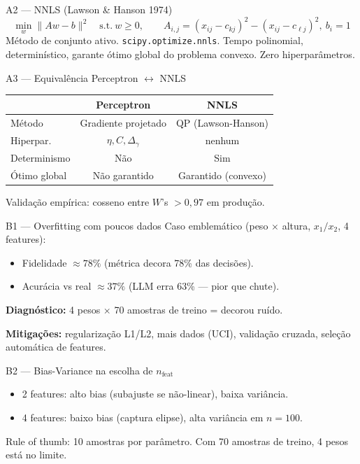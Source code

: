 \documentclass[aspectratio=169,10pt]{beamer}
\begin{document}
\begin{frame}{A2 --- NNLS (Lawson \& Hanson 1974)}
  \scriptsize
  \[ \min_w \|Aw - b\|^2 \quad \text{s.t.}\ w \geq 0, \qquad A_{i,j} = (x_{ij} - c_{kj})^2 - (x_{ij} - c_{\ell j})^2,\ b_i = 1 \]
  M\'etodo de conjunto ativo. \texttt{scipy.optimize.nnls}. Tempo polinomial, determin\'istico, garante \'otimo global do problema convexo. Zero hiperpar\^ametros.
\end{frame}

\begin{frame}{A3 --- Equival\^encia Perceptron $\leftrightarrow$ NNLS}
  \scriptsize
  \begin{center}
  \begin{tabular}{lcc}
    \toprule
    & Perceptron & NNLS \\
    \midrule
    M\'etodo  & Gradiente projetado & QP (Lawson-Hanson) \\
    Hiperpar.\ & $\eta, C, \Delta_\gamma$ & nenhum \\
    Determinismo & N\~ao & Sim \\
    \'Otimo global & N\~ao garantido & Garantido (convexo) \\
    \bottomrule
  \end{tabular}
  \end{center}
  \medskip
  Valida\c{c}\~ao emp\'irica: cosseno entre $W$'s $> 0{,}97$ em produ\c{c}\~ao.
\end{frame}

\begin{frame}{B1 --- Overfitting com poucos dados}
  \footnotesize
  Caso emblem\'atico (peso $\times$ altura, $x_1/x_2$, 4 features):
  \begin{itemize}
    \item Fidelidade $\approx 78\%$ (m\'etrica decora 78\% das decis\~oes).
    \item Acur\'acia vs real $\approx 37\%$ (LLM erra 63\% --- pior que chute).
  \end{itemize}
  \textbf{Diagn\'ostico:} 4 pesos $\times$ 70 amostras de treino = decorou ru\'ido.
  \medskip

  \textbf{Mitiga\c{c}\~oes:} regulariza\c{c}\~ao L1/L2, mais dados (UCI), valida\c{c}\~ao cruzada, sele\c{c}\~ao autom\'atica de features.
\end{frame}

\begin{frame}{B2 --- Bias-Variance na escolha de $n_{\text{feat}}$}
  \footnotesize
  \begin{itemize}
    \item 2 features: alto bias (subajuste se n\~ao-linear), baixa vari\^ancia.
    \item 4 features: baixo bias (captura elipse), alta vari\^ancia em $n=100$.
  \end{itemize}
  \medskip
  Rule of thumb: 10 amostras por par\^ametro. Com 70 amostras de treino, 4 pesos est\'a no limite.
\end{frame}
\end{document}
